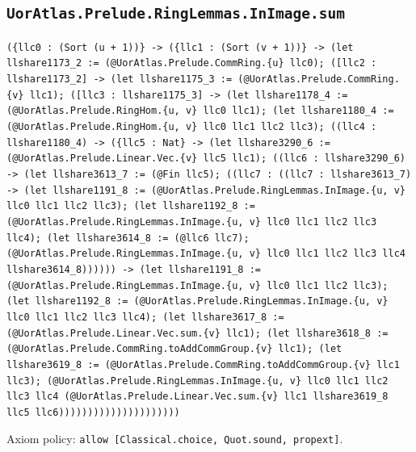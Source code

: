 \documentclass[11pt]{article}
\begin{document}
\subsection*{\texttt{UorAtlas.Prelude.RingLemmas.InImage.sum}}
\noindent\texttt{(\{llc0 : (Sort (u + 1))\} -> (\{llc1 : (Sort (v + 1))\} -> (let llshare1173\_2 := (@UorAtlas.Prelude.CommRing.\{u\} llc0); ([llc2 : llshare1173\_2] -> (let llshare1175\_3 := (@UorAtlas.Prelude.CommRing.\{v\} llc1); ([llc3 : llshare1175\_3] -> (let llshare1178\_4 := (@UorAtlas.Prelude.RingHom.\{u, v\} llc0 llc1); (let llshare1180\_4 := (@UorAtlas.Prelude.RingHom.\{u, v\} llc0 llc1 llc2 llc3); ((llc4 : llshare1180\_4) -> (\{llc5 : Nat\} -> (let llshare3290\_6 := (@UorAtlas.Prelude.Linear.Vec.\{v\} llc5 llc1); ((llc6 : llshare3290\_6) -> (let llshare3613\_7 := (@Fin llc5); ((llc7 : ((llc7 : llshare3613\_7) -> (let llshare1191\_8 := (@UorAtlas.Prelude.RingLemmas.InImage.\{u, v\} llc0 llc1 llc2 llc3); (let llshare1192\_8 := (@UorAtlas.Prelude.RingLemmas.InImage.\{u, v\} llc0 llc1 llc2 llc3 llc4); (let llshare3614\_8 := (@llc6 llc7); (@UorAtlas.Prelude.RingLemmas.InImage.\{u, v\} llc0 llc1 llc2 llc3 llc4 llshare3614\_8)))))) -> (let llshare1191\_8 := (@UorAtlas.Prelude.RingLemmas.InImage.\{u, v\} llc0 llc1 llc2 llc3); (let llshare1192\_8 := (@UorAtlas.Prelude.RingLemmas.InImage.\{u, v\} llc0 llc1 llc2 llc3 llc4); (let llshare3617\_8 := (@UorAtlas.Prelude.Linear.Vec.sum.\{v\} llc1); (let llshare3618\_8 := (@UorAtlas.Prelude.CommRing.toAddCommGroup.\{v\} llc1); (let llshare3619\_8 := (@UorAtlas.Prelude.CommRing.toAddCommGroup.\{v\} llc1 llc3); (@UorAtlas.Prelude.RingLemmas.InImage.\{u, v\} llc0 llc1 llc2 llc3 llc4 (@UorAtlas.Prelude.Linear.Vec.sum.\{v\} llc1 llshare3619\_8 llc5 llc6)))))))))))))))))))))}\par
\noindent Axiom policy: \texttt{allow [Classical.choice, Quot.sound, propext]}.\par
\end{document}
